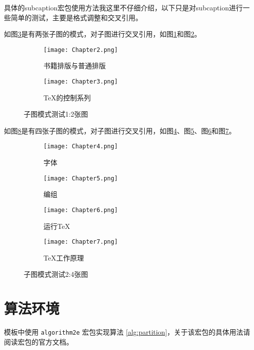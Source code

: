 具体的subcaption宏包使用方法我这里不仔细介绍，以下只是对subcaption进行一些简单的测试，主要是格式调整和交叉引用。

如图\ref{fig:subfig_test1}是有两张子图的模式，对子图进行交叉引用，如图\ref{subfig:1a}和图\ref{subfig:1b}。

\begin{figure}[htbp]
	\centering
	\begin{subfigure}[b]{.4\textwidth}
		\centering
		\texttt{[image: Chapter2.png]}
		\caption{书籍排版与普通排版}\label{subfig:1a}
	\end{subfigure}
	\quad
	\begin{subfigure}[b]{.4\textwidth}
		\centering
		\texttt{[image: Chapter3.png]}
		\caption{\TeX 的控制系列}\label{subfig:1b}
	\end{subfigure}
	\caption{子图模式测试1:2张图}\label{fig:subfig_test1}
\end{figure}

如图\ref{fig:subfig_test2}是有四张子图的模式，对子图进行交叉引用，如图\ref{subfig:2a}、图\ref{subfig:2b}、图\ref{subfig:2c}和图\ref{subfig:2d}。

\begin{figure}[htbp]
	\centering
	\begin{subfigure}[b]{.4\textwidth}
		\centering
		\texttt{[image: Chapter4.png]}
		\caption{字体}\label{subfig:2a}
	\end{subfigure}
	\begin{subfigure}[b]{.4\textwidth}
		\centering
		\texttt{[image: Chapter5.png]}
		\caption{编组}\label{subfig:2b}
	\end{subfigure}
	\begin{subfigure}[b]{.4\textwidth}
		\centering
		\texttt{[image: Chapter6.png]}
		\caption{运行\TeX}\label{subfig:2c}
	\end{subfigure}
	\begin{subfigure}[b]{.4\textwidth}
		\centering
		\texttt{[image: Chapter7.png]}
		\caption{\TeX 工作原理}\label{subfig:2d}
	\end{subfigure}
	\caption{子图模式测试2:4张图}\label{fig:subfig_test2}
\end{figure}

\section{算法环境}

模板中使用 \texttt{algorithm2e} 宏包实现算法 \ref{alg:partition}，关于该宏包的具体用法请阅读宏包的官方文档。

